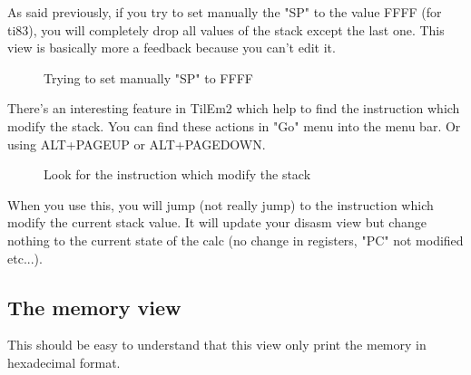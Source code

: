 \documentclass[10pt]{report}
\begin{document}
As said previously, if you try to set manually the "SP" to the value FFFF (for ti83), you will completely drop all values of the stack except the last one.\newline
This view is basically more a feedback because you can't edit it. 
\begin{figure}[H]
\centering
{}
\caption{Trying to set manually "SP" to FFFF}
\end{figure}

There's an interesting feature in TilEm2 which help to find the instruction which modify the stack.\newline
You can find these actions in "Go" menu into the menu bar.\newline
Or using ALT+PAGEUP or ALT+PAGEDOWN.\newline
\begin{figure}[H]
\centering
{}
\caption{Look for the instruction which modify the stack}
\end{figure}

When you use this, you will jump (not really jump) to the instruction which modify the current stack value.\newline
It will update your disasm view but change nothing to the current state of the calc (no change in registers, "PC" not modified etc...).\newline

\subsection{The memory view}

This should be easy to understand that this view only print the memory in hexadecimal format.\newline
\end{document}
